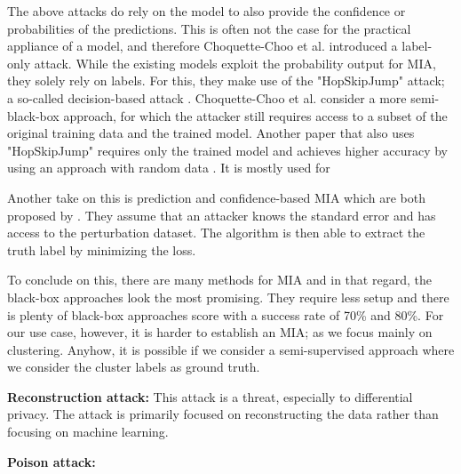 The above attacks do rely on the model to also provide the confidence or probabilities of the predictions.
This is often not the case for the practical appliance of a model, and therefore Choquette-Choo et al. introduced a label-only attack.
While the existing models exploit the probability output for MIA, they solely rely on labels.
For this, they make use of the "HopSkipJump" attack; a so-called decision-based attack \citep{chen_hopskipjumpattack_2020}.
Choquette-Choo et al. consider a more semi-black-box approach, for which the attacker still requires access to a subset of the original training data and the trained model.
Another paper that also uses "HopSkipJump" requires only the trained model and achieves higher accuracy by using an approach with random data \citep{li_membership_2021}.
It is mostly used for

Another take on this is prediction and confidence-based MIA which are both proposed by \citep{yeom_privacy_2018}.
They assume that an attacker knows the standard error and has access to the perturbation dataset.
The algorithm is then able to extract the truth label by minimizing the loss. \newline

To conclude on this, there are many methods for MIA and in that regard, the black-box approaches look the most promising.
They require less setup and there is plenty of black-box approaches score with a success rate of 70\% and 80\%.
For our use case, however, it is harder to establish an MIA; as we focus mainly on clustering.
Anyhow, it is possible if we consider a semi-supervised approach where we consider the cluster labels as ground truth.

\textbf{Reconstruction attack: } This attack is a threat, especially to differential privacy.
The attack is primarily focused on reconstructing the data rather than focusing on machine learning.

\textbf{Poison attack:}

